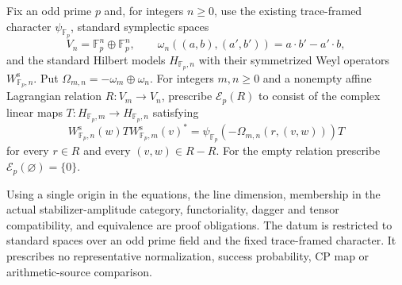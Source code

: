 \begin{definition}
Fix an odd prime $p$ and, for integers $n\geq0$, use the existing trace-framed character
$\psi_{\mathbb F_p}$, standard symplectic spaces
\[
 V_n=\mathbb F_p^n\oplus\mathbb F_p^n,
 \qquad
 \omega_n((a,b),(a',b'))=a\mathbin{\cdot}b'-a'\mathbin{\cdot}b,
\]
and the standard Hilbert models $H_{\mathbb F_p,n}$ with their symmetrized
Weyl operators $W^{\mathrm s}_{\mathbb F_p,n}$.  Put
$\Omega_{m,n}=-\omega_m\oplus\omega_n$.
For integers $m,n\geq0$ and a nonempty affine Lagrangian relation
$R:V_m\to V_n$, prescribe $\mathcal E_p(R)$ to consist of the complex
linear maps $T:H_{\mathbb F_p,m}\to H_{\mathbb F_p,n}$ satisfying
\[
 W_{\mathbb F_p,n}^{\mathrm s}(w)T W_{\mathbb F_p,m}^{\mathrm s}(v)^*
 =\psi_{\mathbb F_p}\!\left(-\Omega_{m,n}(r,(v,w))\right)T
\]
for every $r\in R$ and every $(v,w)\in R-R$.
For the empty relation prescribe $\mathcal E_p(\varnothing)=\{0\}$.
\end{definition}
\begin{scope}
Using a single origin in the equations, the line dimension, membership in the actual stabilizer-amplitude category, functoriality, dagger and tensor compatibility, and equivalence are proof obligations. The datum is restricted to standard spaces over an odd prime field and the fixed trace-framed character. It prescribes no representative normalization, success probability, CP map or arithmetic-source comparison.
\end{scope}
